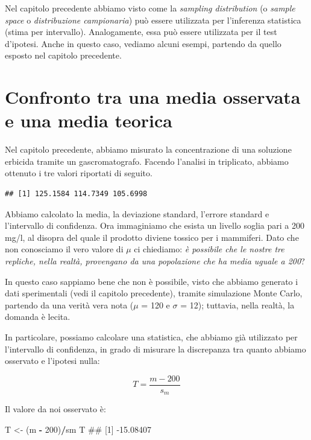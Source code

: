 \documentclass[a4paper,12pt,oneside]{book}
\newenvironment{Shaded}{\begin{snugshade}}{\end{snugshade}}
\newcommand{\DecValTok}[1]{\textcolor[rgb]{0.00,0.00,0.81}{#1}}
\newcommand{\StringTok}[1]{\textcolor[rgb]{0.31,0.60,0.02}{#1}}
\newcommand{\OperatorTok}[1]{\textcolor[rgb]{0.81,0.36,0.00}{\textbf{#1}}}
\newcommand{\NormalTok}[1]{#1}
\theoremstyle{definition}
\theoremstyle{definition}
\theoremstyle{definition}
\theoremstyle{remark}
\begin{document}
Nel capitolo precedente abbiamo visto come la \emph{sampling
distribution} (o \emph{sample space} o \emph{distribuzione campionaria})
può essere utilizzata per l'inferenza statistica (stima per intervallo).
Analogamente, essa può essere utilizzata per il test d'ipotesi. Anche in
questo caso, vediamo alcuni esempi, partendo da quello esposto nel
capitolo precedente.

\section{Confronto tra una media osservata e una media
teorica}\label{confronto-tra-una-media-osservata-e-una-media-teorica}

Nel capitolo precedente, abbiamo misurato la concentrazione di una
soluzione erbicida tramite un gascromatografo. Facendo l'analisi in
triplicato, abbiamo ottenuto i tre valori riportati di seguito.

\begin{verbatim}
## [1] 125.1584 114.7349 105.6998
\end{verbatim}

Abbiamo calcolato la media, la deviazione standard, l'errore standard e
l'intervallo di confidenza. Ora immaginiamo che esista un livello soglia
pari a 200 mg/l, al disopra del quale il prodotto diviene tossico per i
mammiferi. Dato che non conosciamo il vero valore di \(\mu\) ci
chiediamo: \emph{è possibile che le nostre tre repliche, nella realtà,
provengano da una popolazione che ha media uguale a 200}?

In questo caso sappiamo bene che non è possibile, visto che abbiamo
generato i dati sperimentali (vedi il capitolo precedente), tramite
simulazione Monte Carlo, partendo da una verità vera nota (\(\mu\) = 120
e \(\sigma\) = 12); tuttavia, nella realtà, la domanda è lecita.

In particolare, possiamo calcolare una statistica, che abbiamo già
utilizzato per l'intervallo di confidenza, in grado di misurare la
discrepanza tra quanto abbiamo osservato e l'ipotesi nulla:

\[ T = \frac{m - 200}{s_m} \]

Il valore da noi osservato è:

\begin{Shaded}
\begin{Highlighting}[]
\NormalTok{T <-}\StringTok{ }\NormalTok{(m }\OperatorTok{-}\StringTok{ }\DecValTok{200}\NormalTok{)}\OperatorTok{/}\NormalTok{sm}
\NormalTok{T}
\NormalTok{## [1] -15.08407}
\end{Highlighting}
\end{Shaded}
\end{document}
